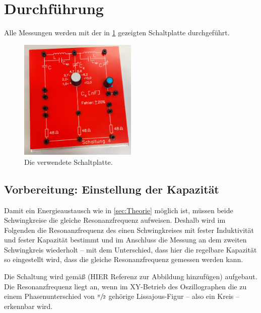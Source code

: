 \section{Durchführung}
\label{sec:Durchführung}

Alle Messungen werden mit der in \ref{fig:platte}
gezeigten Schaltplatte durchgeführt. 
\begin{figure}
    \centering
    \includegraphics[width=0.5\textwidth]{plots/Platte.jpeg}
    \caption{Die verwendete Schaltplatte.}
    \label{fig:platte}
\end{figure}

\subsection{Vorbereitung: Einstellung der Kapazität}
Damit ein Energieaustausch wie in \ref{sec:Theorie} möglich ist, müssen beide Schwingkreise die gleiche Resonanzfrequenz 
aufweisen. 
Deshalb wird im Folgenden die Resonanzfrequenz des einen Schwingkreises mit fester Induktivität und fester Kapazität bestimmt 
und im Anschluss die Messung an dem zweiten Schwingkreis wiederholt -- mit dem Unterschied, dass hier die regelbare Kapazität so
eingestellt wird, dass die gleiche Resonanzfrequenz gemessen werden kann. 

Die Schaltung wird gemäß (HIER Referenz zur Abbildung hinzufügen) aufgebaut. 
Die Resonanzfrequenz liegt an, wenn im XY-Betrieb des Oszillographen die zu einem Phasenunterschied von $\sfrac{\pi}{2}$ 
gehörige Lissajous-Figur --  also ein Kreis -- erkennbar wird.

